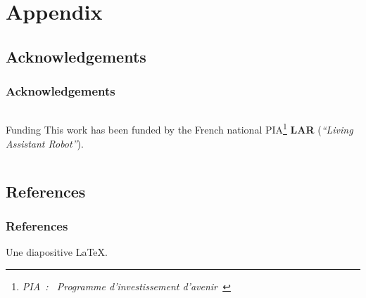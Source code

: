\documentclass[10pt,c]{beamer}
\begin{document}

\appendix


\section{Appendix}

\subsection{Acknowledgements}

\begin{frame}
\frametitle{Acknowledgements}
\begin{columns}[c]
\begin{column}{8.25cm}
\begin{block}{Funding}
This work has been funded by the French national PIA\footnote{\textsl{PIA~:
\guillemotleft~Programme d'investissement d'avenir~\guillemotright}}
\textbf{LAR} (\textit{``Living Assistant Robot''}).
\end{block}
\end{column}
\end{columns}
\end{frame}

\subsection{References}

\begin{frame}
\frametitle{References}
Une diapositive \LaTeX.
\end{frame}


\end{document}
